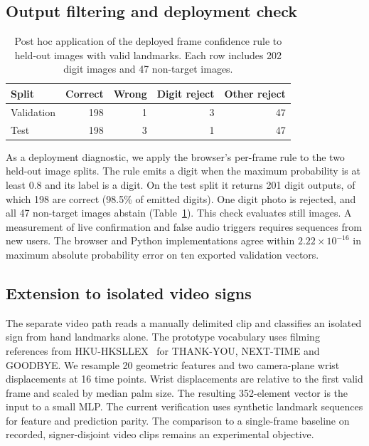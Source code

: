 \subsection{Output filtering and deployment check}

\begin{table}[t]
  \centering
  \caption{Post hoc application of the deployed frame confidence rule to
  held-out images with valid landmarks. Each row includes 202 digit images
  and 47 non-target images.}
  \label{tab:reject}
  \small
  \setlength{\tabcolsep}{4pt}
  \begin{tabular}{lrrrr}
  \hline
  Split & Correct & Wrong & Digit reject & Other reject \\
  \hline
  Validation & 198 & 1 & 3 & 47 \\
  Test       & 198 & 3 & 1 & 47 \\
  \hline
  \end{tabular}
\end{table}

As a deployment diagnostic, we apply the browser's per-frame rule to the two
held-out image splits. The rule emits a digit when the maximum probability is
at least 0.8 and its label is a digit. On the test split it returns 201
digit outputs, of which 198 are correct (98.5\% of emitted digits). One
digit photo is rejected, and all 47 non-target images abstain
(Table~\ref{tab:reject}). This check evaluates still images. A measurement
of live confirmation and false audio triggers requires sequences from new
users. The browser and Python implementations agree within $2.22\times10^{-16}$
in maximum absolute probability error on ten exported validation vectors.

\subsection{Extension to isolated video signs}

The separate video path reads a manually delimited clip and classifies an
isolated sign from hand landmarks alone. The prototype vocabulary uses
filming references from HKU-HKSLLEX~\cite{hku_hksllex} for THANK-YOU,
NEXT-TIME and GOODBYE. We resample 20 geometric features and two camera-plane
wrist displacements at 16 time points. Wrist displacements are relative to
the first valid frame and scaled by median palm size. The resulting
352-element vector is the input to a small MLP. The current verification uses
synthetic landmark sequences for feature and prediction parity. The
comparison to a single-frame baseline on recorded, signer-disjoint video
clips remains an experimental objective.
